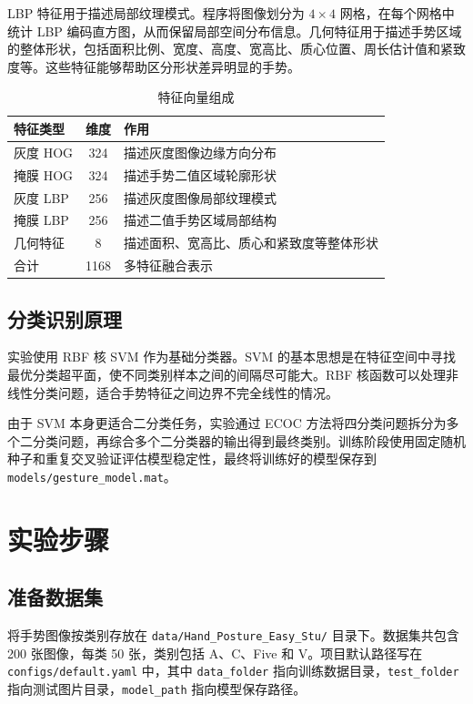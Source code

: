\documentclass[UTF8,a4paper,10pt]{ctexart}
\begin{document}
LBP 特征用于描述局部纹理模式\cite{ojala2002multiresolution}。程序将图像划分为 $4\times4$ 网格，在每个网格中统计 LBP 编码直方图，从而保留局部空间分布信息。几何特征用于描述手势区域的整体形状，包括面积比例、宽度、高度、宽高比、质心位置、周长估计值和紧致度等。这些特征能够帮助区分形状差异明显的手势。

\begin{table}[!htbp]
  \centering
  \begin{tabular}{lcl}
  \toprule
  特征类型 & 维度 & 作用\\
  \midrule
  灰度 HOG & 324 & 描述灰度图像边缘方向分布\\
  掩膜 HOG & 324 & 描述手势二值区域轮廓形状\\
  灰度 LBP & 256 & 描述灰度图像局部纹理模式\\
  掩膜 LBP & 256 & 描述二值手势区域局部结构\\
  几何特征 & 8 & 描述面积、宽高比、质心和紧致度等整体形状\\
  \midrule
  合计 & 1168 & 多特征融合表示\\
  \bottomrule
  \end{tabular}
  \caption{特征向量组成}
  \label{tab:feature}
\end{table}

\subsection{分类识别原理}
实验使用 RBF 核 SVM 作为基础分类器。SVM 的基本思想是在特征空间中寻找最优分类超平面，使不同类别样本之间的间隔尽可能大\cite{cortes1995support}。RBF 核函数可以处理非线性分类问题，适合手势特征之间边界不完全线性的情况。

由于 SVM 本身更适合二分类任务，实验通过 ECOC 方法将四分类问题拆分为多个二分类问题，再综合多个二分类器的输出得到最终类别\cite{dietterich1995solving}。训练阶段使用固定随机种子和重复交叉验证评估模型稳定性，最终将训练好的模型保存到 \texttt{models/gesture\_model.mat}。

\section{实验步骤}
\subsection{准备数据集}
将手势图像按类别存放在 \texttt{data/Hand\_Posture\_Easy\_Stu/} 目录下。数据集共包含 200 张图像，每类 50 张，类别包括 A、C、Five 和 V。项目默认路径写在 \texttt{configs/default.yaml} 中，其中 \texttt{data\_folder} 指向训练数据目录，\texttt{test\_folder} 指向测试图片目录，\texttt{model\_path} 指向模型保存路径。
\end{document}
